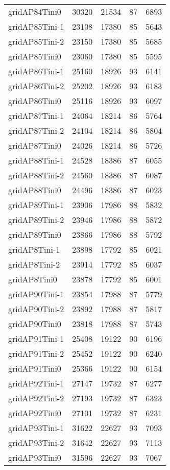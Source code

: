 \begin{longtable}{lrrrr}
gridAP84Tini0 & 30320 & 21534 & 87 & 6893 \\
gridAP85Tini-1 & 23108 & 17380 & 85 & 5643 \\
gridAP85Tini-2 & 23150 & 17380 & 85 & 5685 \\
gridAP85Tini0 & 23060 & 17380 & 85 & 5595 \\
gridAP86Tini-1 & 25160 & 18926 & 93 & 6141 \\
gridAP86Tini-2 & 25202 & 18926 & 93 & 6183 \\
gridAP86Tini0 & 25116 & 18926 & 93 & 6097 \\
gridAP87Tini-1 & 24064 & 18214 & 86 & 5764 \\
gridAP87Tini-2 & 24104 & 18214 & 86 & 5804 \\
gridAP87Tini0 & 24026 & 18214 & 86 & 5726 \\
gridAP88Tini-1 & 24528 & 18386 & 87 & 6055 \\
gridAP88Tini-2 & 24560 & 18386 & 87 & 6087 \\
gridAP88Tini0 & 24496 & 18386 & 87 & 6023 \\
gridAP89Tini-1 & 23906 & 17986 & 88 & 5832 \\
gridAP89Tini-2 & 23946 & 17986 & 88 & 5872 \\
gridAP89Tini0 & 23866 & 17986 & 88 & 5792 \\
gridAP8Tini-1 & 23898 & 17792 & 85 & 6021 \\
gridAP8Tini-2 & 23914 & 17792 & 85 & 6037 \\
gridAP8Tini0 & 23878 & 17792 & 85 & 6001 \\
gridAP90Tini-1 & 23854 & 17988 & 87 & 5779 \\
gridAP90Tini-2 & 23892 & 17988 & 87 & 5817 \\
gridAP90Tini0 & 23818 & 17988 & 87 & 5743 \\
gridAP91Tini-1 & 25408 & 19122 & 90 & 6196 \\
gridAP91Tini-2 & 25452 & 19122 & 90 & 6240 \\
gridAP91Tini0 & 25366 & 19122 & 90 & 6154 \\
gridAP92Tini-1 & 27147 & 19732 & 87 & 6277 \\
gridAP92Tini-2 & 27193 & 19732 & 87 & 6323 \\
gridAP92Tini0 & 27101 & 19732 & 87 & 6231 \\
gridAP93Tini-1 & 31622 & 22627 & 93 & 7093 \\
gridAP93Tini-2 & 31642 & 22627 & 93 & 7113 \\
gridAP93Tini0 & 31596 & 22627 & 93 & 7067 \\

\end{longtable}

